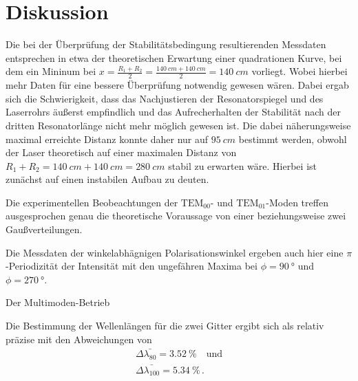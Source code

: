 \section{Diskussion}
\label{sec:Diskussion}

Die bei der Überprüfung der Stabilitätsbedingung resultierenden Messdaten entsprechen in etwa der theoretischen Erwartung
einer quadrationen Kurve, bei dem ein Mininum bei $ x = \frac{R_1 + R_2}{2} = \frac{\qty{140}{cm} + \qty{140}{cm}}{2} = \qty{140}{cm}$ vorliegt.
Wobei hierbei mehr Daten für eine bessere Überprüfung notwendig gewesen wären.
Dabei ergab sich die Schwierigkeit, 
dass das Nachjustieren der Resonatorspiegel und des Laserrohrs äußerst empfindlich
und das Aufrecherhalten der Stabilität nach der dritten Resonatorlänge nicht mehr möglich gewesen ist.
Die dabei näherungsweise maximal erreichte Distanz konnte daher nur auf $\qty{95}{cm}$ bestimmt werden, 
obwohl der Laser theoretisch auf einer maximalen Distanz von $R_1 + R_2 =  \qty{140}{cm} + \qty{140}{cm} = \qty{280}{cm}$ stabil zu erwarten wäre. 
Hierbei ist zunächst auf einen instabilen Aufbau zu deuten. 

Die experimentellen Beobeachtungen der $\text{TEM}_{00}$- und $\text{TEM}_{01}$-Moden treffen ausgesprochen genau die
theoretische Voraussage von einer beziehungsweise zwei Gaußverteilungen.

Die Messdaten der winkelabhägnigen Polarisationswinkel ergeben auch hier eine $\pi$-Periodizität der Intensität
mit den ungefähren Maxima bei $\phi = \qty{90}{\degree}$ und $\phi = \qty{270}{\degree}$.

Der Multimoden-Betrieb

Die Bestimmung der Wellenlängen für die zwei Gitter ergibt sich als relativ präzise mit den Abweichungen von
\begin{align*}
    \Delta \bar{\lambda_{80}} = \qty{3.52}{\percent} \quad \text{und} \\
    \Delta \bar{\lambda_{100}} = \qty{5.34}{\percent} \, .
\end{align*}